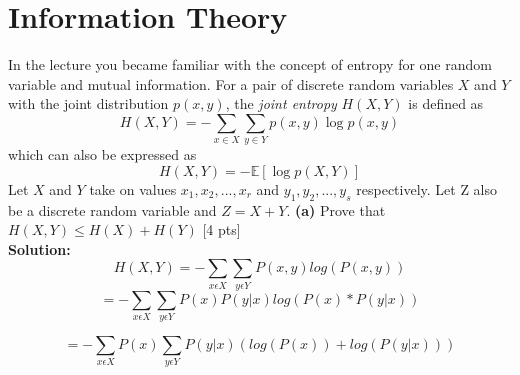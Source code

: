 \documentclass[twoside,10pt]{article}
\begin{document}
\section{Information Theory}
In the lecture you became familiar with the concept of entropy for one random variable and mutual information. For a pair of discrete random variables $X$ and $Y$ with the joint distribution $p(x,y)$, the \emph{joint entropy} $H(X,Y)$ is defined as
\begin{equation}
H(X,Y)=-\sum_{x\in X}\sum_{y\in Y}{p(x,y)\log p(x,y)}
\end{equation}
which can also be expressed as
\begin{equation}
H(X,Y)=-\mathbb{E}[\log p(X,Y)]
\end{equation}
Let $X$ and $Y$ take on values $x_1,x_2,...,x_r$ and $y_1,y_2,...,y_s$ respectively. Let Z also be a discrete random variable and $Z=X+Y$.
\newline
\newline
\textbf{(a)} Prove that $H(X,Y)\leq H(X)+H(Y)$ [4 pts]\\ 
\textbf{ Solution: } \\
$$H(X,Y) = -\sum_{x \epsilon X}{\sum_{y \epsilon Y}{P(x,y)log(P(x,y))}}$$
$$
= -\sum_{x \epsilon X}{\sum_{y \epsilon Y}{P(x)P(y|x)log(P(x)* P(y|x))}}
$$

$$
= -\sum_{x \epsilon X}{P(x)\sum_{y \epsilon Y}{P(y|x)(log(P(x))+ log(P(y|x)))}}
$$
\end{document}

